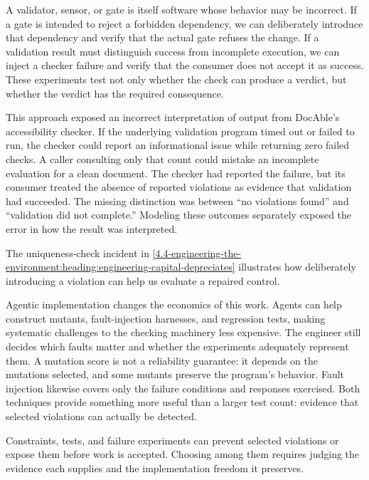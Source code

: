 A validator, sensor, or gate is itself software whose behavior may be incorrect. If a gate is intended to reject a forbidden dependency, we can deliberately introduce that dependency and verify that the actual gate refuses the change. If a validation result must distinguish success from incomplete execution, we can inject a checker failure and verify that the consumer does not accept it as success. These experiments test not only whether the check can produce a verdict, but whether the verdict has the required consequence.

This approach exposed an incorrect interpretation of output from DocAble's accessibility checker. If the underlying validation program timed out or failed to run, the checker could report an informational issue while returning zero failed checks. A caller consulting only that count could mistake an incomplete evaluation for a clean document. The checker had reported the failure, but its consumer treated the absence of reported violations as evidence that validation had succeeded. The missing distinction was between ``no violations found'' and ``validation did not complete.'' Modeling these outcomes separately exposed the error in how the result was interpreted.

The uniqueness-check incident in \autoref{4.4-engineering-the-environment:heading:engineering-capital-depreciates} illustrates how deliberately introducing a violation can help us evaluate a repaired control.

Agentic implementation changes the economics of this work. Agents can help construct mutants, fault-injection harnesses, and regression tests, making systematic challenges to the checking machinery less expensive. The engineer still decides which faults matter and whether the experiments adequately represent them. A mutation score is not a reliability guarantee: it depends on the mutations selected, and some mutants preserve the program's behavior. Fault injection likewise covers only the failure conditions and responses exercised. Both techniques provide something more useful than a larger test count: evidence that selected violations can actually be detected.

Constraints, tests, and failure experiments can prevent selected violations or expose them before work is accepted. Choosing among them requires judging the evidence each supplies and the implementation freedom it preserves.

